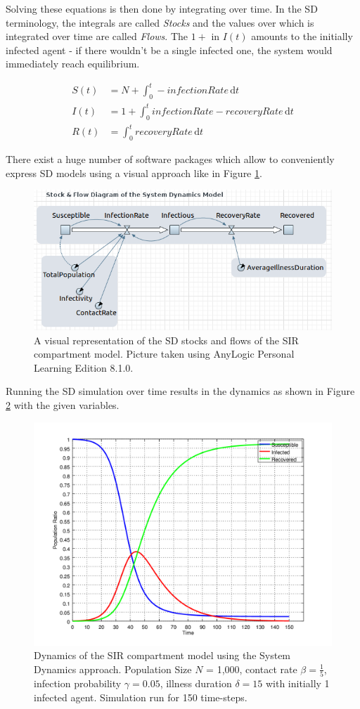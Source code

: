 Solving these equations is then done by integrating over time. In the SD terminology, the integrals are called \textit{Stocks} and the values over which is integrated over time are called \textit{Flows}. The $1+$ in $I(t)$ amounts to the initially infected agent - if there wouldn't be a single infected one, the system would immediately reach equilibrium.

\begin{align}
S(t) &= N + \int_0^t -infectionRate\, \mathrm{d}t \\
I(t) &= 1 + \int_0^t infectionRate - recoveryRate\, \mathrm{d}t \\
R(t) &= \int_0^t recoveryRate\, \mathrm{d}t
\end{align}

There exist a huge number of software packages which allow to conveniently express SD models using a visual approach like in Figure \ref{fig:sir_sd_stockflow_diagramm}.

\begin{figure}
	\centering
	\includegraphics[width=.4\textwidth, angle=0]{./shared/fig/diagrams/SIR_SD_STOCKFLOW_DIAGRAMM.png}
	\caption{A visual representation of the SD stocks and flows of the SIR compartment model. Picture taken using AnyLogic Personal Learning Edition 8.1.0.}
	\label{fig:sir_sd_stockflow_diagramm}
\end{figure}

Running the SD simulation over time results in the dynamics as shown in Figure \ref{fig:sir_sd_dynamics} with the given variables.

\begin{figure}
	\centering
	\includegraphics[width=.4\textwidth, angle=0]{./shared/fig/frsd/SIR_SD_1000agents_150t_001dt.png}
	\caption{Dynamics of the SIR compartment model using the System Dynamics approach. Population Size $N$ = 1,000, contact rate $\beta =  \frac{1}{5}$, infection probability $\gamma = 0.05$, illness duration $\delta = 15$ with initially 1 infected agent. Simulation run for 150 time-steps.}
	\label{fig:sir_sd_dynamics}
\end{figure}

